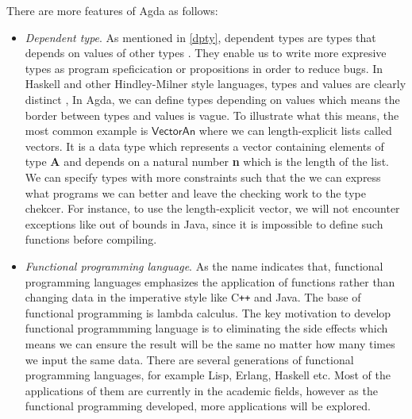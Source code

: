 There are more features of Agda as follows:

\begin{itemize}
\item \textit{Dependent type}. 
As mentioned in \ref{dpty}, dependent types are types that depends on values of other types \cite{dtw}. They enable us to write more expresive types as program speficication or propositions in order to reduce bugs. In Haskell and other Hindley-Milner style languages, types and values are clearly distinct \cite{tutorial}, In Agda, we can define types depending on values which means the border between types and values is vague. To illustrate what this means, the most common example is $\mathsf{Vector A n}$ where we can length-explicit lists called vectors. It is a data type which represents a vector containing elements of type \textbf{A} and depends on a natural number \textbf{n} which is the length of the list. We can specify types with more constraints such that the we can express what programs we can better and leave the checking work to the type chekcer. For instance, to use the length-explicit vector, we will not encounter exceptions like out of bounds in Java, since it is impossible to define such functions before compiling.

\item \textit{Functional programming language}. As the name indicates that, functional programming languages emphasizes the application of functions rather than changing data in the imperative style like C{}\verb!++! and Java. The base of functional programming is lambda calculus. The key motivation to develop functional programmming language is to eliminating the side effects which means we can ensure the result will be the same no matter how many times we input the same data. There are several generations of functional programming languages, for example Lisp, Erlang, Haskell etc. Most of the applications of them are currently in the academic fields, however as the functional programming developed, more applications will be explored.



\end{itemize}

